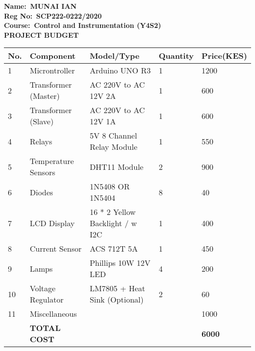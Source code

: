 \documentclass[11pt, letterpaper]{article}
\begin{document}
\begin{center}
    \textbf{Name: \,MUNAI IAN\\
        Reg No:\, SCP222-0222/2020\\
        Course: \,Control and Instrumentation (Y4S2)\\}
    \vspace{0.5cm}
    \textbf{PROJECT BUDGET} \\

    \vspace{0.35cm}

\end{center}


\begin{table} [H]
    \centering
    \def\arraystretch{2}
    \begin{tabular}{|l|l|l|l|l|}
        \hline
        \textbf{No.} & \textbf{Component}   & \textbf{Model/Type}              & \textbf{Quantity} & \textbf{Price(KES)} \\ \hline
        1            & Microntroller        & Arduino UNO R3                   & 1                 & 1200                \\ \hline
        2            & Transformer (Master) & AC 220V to AC 12V 2A             & 1                 & 600                 \\ \hline
        3            & Transformer (Slave)  & AC 220V to AC 12V 1A             & 1                 & 600                 \\ \hline
        4            & Relays               & 5V 8 Channel Relay Module        & 1                 & 550                 \\ \hline
        5            & Temperature Sensors  & DHT11 Module                     & 2                 & 900                 \\ \hline
        6            & Diodes               & 1N5408 OR 1N5404                 & 8                 & 40                  \\ \hline
        7            & LCD Display          & 16 * 2 Yellow Backlight / w  I2C & 1                 & 400                 \\ \hline
        8            & Current Sensor       & ACS 712T 5A                      & 1                 & 450                 \\ \hline
        9            & Lamps                & Phillips 10W 12V LED             & 4                 & 200                 \\\hline
        10           & Voltage Regulator    & LM7805  + Heat Sink (Optional)   & 2                 & 60                  \\ \hline
        11           & Miscellaneous        &                                  &                   & 1000                \\ \hline
                     & \textbf{TOTAL COST } &                                  &                   & \textbf{6000}       \\ \hline
    \end{tabular}

\end{table}
\end{document}
